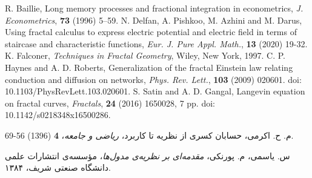 \documentclass[11pt, twoside]{imsproc}
\begin{document}
\begin{thebibliography}{99}%
\begin{LTRbibitems}
\resetlatinfont

R. Baillie, Long memory processes and fractional integration in econometrics, \emph{J.  Econometrics},  \textbf{73}  (1996) 5–59.
N. Delfan, A. Pishkoo, M.  Azhini and M. Darus, Using fractal calculus to express electric potential and electric field in terms of staircase and characteristic functions, \emph{Eur. J.  Pure   Appl.  Math.}, \textbf{13} (2020) 19-32.
K. Falconer, \emph{Techniques in Fractal Geometry}, Wiley,  New York, 1997.
C. P. Haynes and A. D.  Roberts, Generalization of the fractal Einstein law relating conduction and diffusion on networks, \emph{Phys. Rev.  Lett.}, \textbf{103} (2009) 020601. doi: 10.1103/PhysRevLett.103.020601.
S. Satin and  A. D. Gangal, Langevin equation on fractal curves, \emph{Fractals}, \textbf{24} (2016) 1650028, 7 pp.  doi: 10.1142/s0218348x16500286.
\end{LTRbibitems}

م. ح. اکرمی، حسابان کسری از نظریه تا کاربرد،
\emph{ریاضی و جامعه}،
 \textbf{4} (1396) 56-69.

س. یاسمی، م. پورنکی، {\em مقدمه‌ای بر نظریه‌ی مدول‌ها}، مؤسسه‌ی انتشارات علمی دانشگاه صنعتی شریف، 
   ۱۳۸۴.
\end{thebibliography}

\bigskip
\bigskip 
\end{document}
